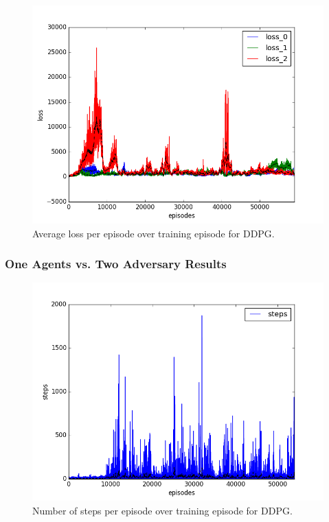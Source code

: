 \begin{figure}[h]
  \centering
  \includegraphics[trim=10 10 10 10,clip,width=\figscale\linewidth]
  {../results/ddpg_1vs2/loss.png}
  \caption{Average loss per episode over training episode for DDPG.}
  \label{fig:ddpg-1vs2}
\end{figure}
\FloatBarrier


\subsubsection{One Agents vs. Two Adversary Results}
\label{sec:experiment:ddpg:2vs1}


\begin{figure}[h]
  \centering
  \includegraphics[trim=10 10 10 10,clip,width=\figscale\linewidth]
  {../results/ddpg_2vs1/steps.png}
  \caption{Number of steps per episode over training episode for DDPG.}
  \label{fig:ddpg-2vs1}
\end{figure}
\FloatBarrier


